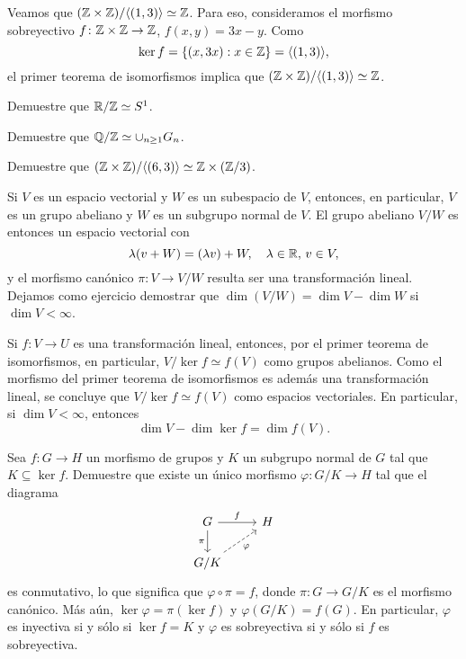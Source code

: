 \begin{example}
Veamos que $(\mathbb{Z}\times\mathbb{Z})/\langle (1,3)\rangle\simeq\mathbb{Z}$. Para eso, consideramos el morfismo sobreyectivo
$f\colon\mathbb{Z}\times\mathbb{Z}\to\mathbb{Z}$, $f(x,y)=3x-y$. Como 
\[
\ker f=\{(x,3x):x\in\mathbb{Z}\}=\langle (1,3)\rangle,
\]
el primer
teorema de isomorfismos implica que $(\mathbb{Z}\times\mathbb{Z})/\langle (1,3)\rangle\simeq\mathbb{Z}$. 
\end{example}

\begin{exercise}
Demuestre que $\mathbb{R}/\mathbb{Z}\simeq S^1$.	
\end{exercise}



\begin{exercise}
Demuestre que $\mathbb{Q}/\mathbb{Z}\simeq\cup_{n\geq1}G_n$.
\end{exercise}

\begin{exercise}
Demuestre que $(\mathbb{Z}\times\mathbb{Z})/\langle (6,3)\rangle\simeq\mathbb{Z}\times(\mathbb{Z}/3)$.
\end{exercise}

\begin{example}
Si $V$ es un espacio vectorial y $W$ es un subespacio de $V$, entonces, en particular, 
$V$ es un grupo abeliano y $W$ es un subgrupo normal de $V$. El grupo abeliano 
$V/W$ es entonces un espacio vectorial con 
\[
\lambda(v+W)=(\lambda v)+W,\quad \lambda\in\mathbb{R},\,v\in V,
\]
y el morfismo canónico $\pi\colon V\to V/W$ resulta ser una transformación lineal. 
Dejamos como ejercicio 
demostrar que 
$\dim (V/W)=\dim V-\dim W$
si $\dim V<\infty$. 

Si $f\colon V\to U$ es una transformación lineal, entonces, por el primer teorema de isomorfismos, en particular, 
$V/\ker f\simeq f(V)$ como grupos abelianos. Como el morfismo del primer teorema de isomorfismos es además una transformación lineal, 
se concluye que $V/\ker f\simeq f(V)$ como espacios vectoriales. En particular, si $\dim V<\infty$, entonces 
\[
\dim V-\dim\ker f=\dim f(V).
\]
\end{example}

\begin{exercise}
\label{xca:cocientes}
Sea $f\colon G\to H$ un morfismo de grupos y $K$ un subgrupo normal de $G$ tal que $K\subseteq\ker f$. Demuestre que existe 
un único morfismo $\varphi\colon G/K\to H$ tal que el diagrama
\[\begin{tikzcd}
	G & H \\
	{G/K}
	\arrow["f", from=1-1, to=1-2]
	\arrow["\pi"', from=1-1, to=2-1]
	\arrow["\varphi"', dashed, from=2-1, to=1-2]
\end{tikzcd}
\]
es conmutativo, lo que significa que $\varphi\circ\pi=f$, donde $\pi\colon G\to G/K$ es el morfismo canónico. 
Más aún, $\ker\varphi=\pi(\ker f)$ y $\varphi(G/K)=f(G)$. 
En particular, $\varphi$ es inyectiva si y sólo si $\ker f=K$ y $\varphi$ es sobreyectiva si y sólo si $f$ es sobreyectiva. 
\end{exercise}

